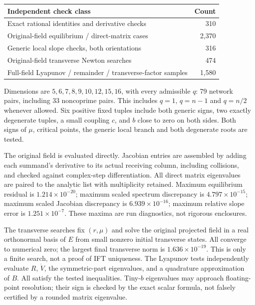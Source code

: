 \documentclass[11pt]{article}
\begin{document}
\begin{center}
\begin{tabular}{lr}
\toprule
Independent check class & Count\\\midrule
Exact rational identities and derivative checks & 310\\
Original-field equilibrium / direct-matrix cases & 2,370\\
Generic local slope checks, both orientations & 316\\
Original-field transverse Newton searches & 474\\
Full-field Lyapunov / remainder / transverse-factor samples & 1,580\\
\bottomrule
\end{tabular}
\end{center}
Dimensions are $5,6,7,8,9,10,12,15,16$, with every admissible $q$:
79 network pairs, including 33 noncoprime pairs. This includes $q=1$,
$q=n-1$ and $q=n/2$ whenever allowed. Six positive fixed tuples include
both generic signs, two exactly degenerate tuples, a small coupling $c$,
and $b$ close to zero on both sides. Both signs of $\mu$, critical points,
the generic local branch and both degenerate roots are tested.

The original field is evaluated directly. Jacobian entries are assembled
by adding each summand's derivative to its actual receiving column,
including collisions, and checked against complex-step differentiation.
All direct matrix eigenvalues are paired to the analytic list with
multiplicity retained. Maximum equilibrium residual is
$1.214\times10^{-20}$; maximum scaled spectrum discrepancy is
$4.797\times10^{-15}$; maximum scaled Jacobian discrepancy is
$6.939\times10^{-16}$; maximum relative slope error is
$1.251\times10^{-7}$. These maxima are run diagnostics, not rigorous
enclosures.

The transverse searches fix $(r,\mu)$ and solve the original projected
field in a real orthonormal basis of $E$ from small nonzero initial
transverse states. All converge to numerical zero; the largest final
transverse norm is $1.636\times10^{-19}$. This is only a finite search,
not a proof of IFT uniqueness. The Lyapunov tests independently evaluate
$R$, $\dot V$, the symmetric-part eigenvalues, and a quadrature approximation
of $B$. All satisfy the tested inequalities. Tiny-$b$ eigenvalues may
approach floating-point resolution; their sign is checked by the exact
scalar formula, not falsely certified by a rounded matrix eigenvalue.
\end{document}
